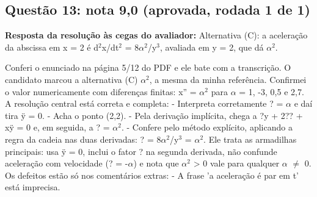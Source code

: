 \documentclass{article}%
\begin{document}
\subsection*{Questão 13: nota 9,0 (aprovada, rodada 1 de 1)}%
\textbf{Resposta da resolução às cegas do avaliador:} Alternativa (C): a aceleração da abscissa em x = 2 é d$^2$x/dt$^2$ = 8$\alpha$$^2$/y$^3$, avaliada em y = 2, que dá $\alpha$$^2$.\par %
Conferi o enunciado na página 5/12 do PDF e ele bate com a transcrição. O candidato marcou a alternativa (C) $\alpha$$^2$, a mesma da minha referência. Confirmei o valor numericamente com diferenças finitas: x'' = $\alpha$$^2$ para $\alpha$ = 1, -3, 0,5 e 2,7.\newline%
\newline%
A resolução central está correta e completa:\newline%
{-} Interpreta corretamente ? = $\alpha$ e daí tira ÿ = 0.\newline%
{-} Acha o ponto (2,2).\newline%
{-} Pela derivação implícita, chega a ?y + 2?? + xÿ = 0 e, em seguida, a ? = $\alpha$$^2$.\newline%
{-} Confere pelo método explícito, aplicando a regra da cadeia nas duas derivadas: ? = 8$\alpha$$^2$/y$^3$ = $\alpha$$^2$.\newline%
\newline%
Ele trata as armadilhas principais: usa ÿ = 0, inclui o fator ? na segunda derivada, não confunde aceleração com velocidade (? = -$\alpha$) e nota que $\alpha$$^2$ > 0 vale para qualquer $\alpha$ $\neq$ 0.\newline%
\newline%
Os defeitos estão só nos comentários extras:\newline%
{-} A frase 'a aceleração é par em t' está imprecisa.\newline%
\end{document}
